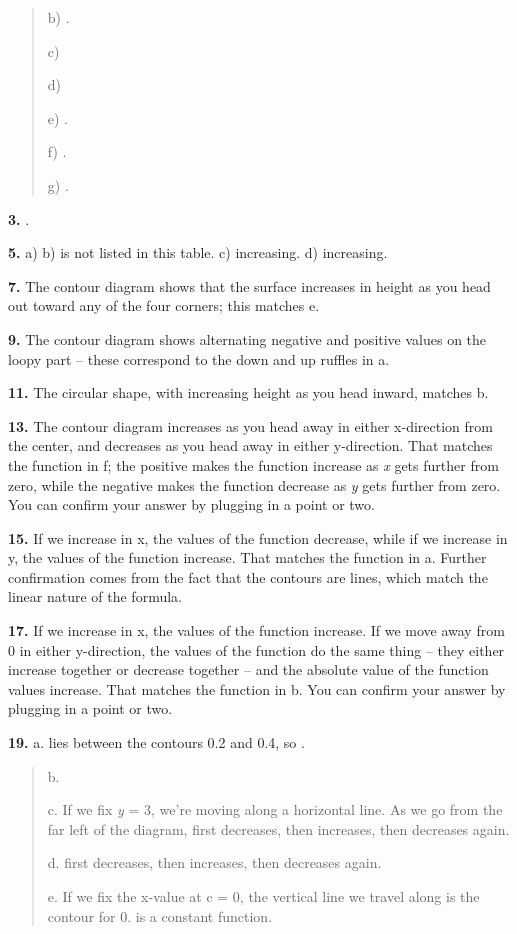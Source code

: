 \begin{quote}
b) .

c)

d)

e) .

f) .

g) .
\end{quote}

\textbf{3.} .

\textbf{5.} a) b) is not listed in this table. c) increasing. d)
increasing.

\textbf{7.} The contour diagram shows that the surface increases in
height as you head out toward any of the four corners; this matches e.

\textbf{9.} The contour diagram shows alternating negative and positive
values on the loopy part -- these correspond to the down and up ruffles
in a.

\textbf{11.} The circular shape, with increasing height as you head
inward, matches b.

\textbf{13.} The contour diagram increases as you head away in either
x-direction from the center, and decreases as you head away in either
y-direction. That matches the function in f; the positive makes the
function increase as \emph{x} gets further from zero, while the negative
makes the function decrease as \emph{y} gets further from zero. You can
confirm your answer by plugging in a point or two.

\textbf{15.} If we increase in x, the values of the function decrease,
while if we increase in y, the values of the function increase. That
matches the function in a. Further confirmation comes from the fact that
the contours are lines, which match the linear nature of the formula.

\textbf{17.} If we increase in x, the values of the function increase.
If we move away from 0 in either y-direction, the values of the function
do the same thing -- they either increase together or decrease together
-- and the absolute value of the function values increase. That matches
the function in b. You can confirm your answer by plugging in a point or
two.

\textbf{19.} a. lies between the contours 0.2 and 0.4, so .

\begin{quote}
b.

c. If we fix \emph{y} = 3, we're moving along a horizontal line. As we
go from the far left of the diagram, first decreases, then increases,
then decreases again.

d. first decreases, then increases, then decreases again.

e. If we fix the x-value at c = 0, the vertical line we travel along is
the contour for 0. is a constant function.
\end{quote}

